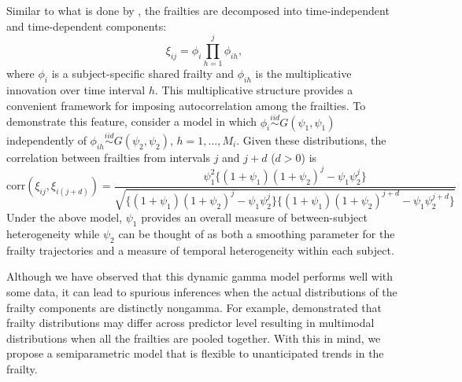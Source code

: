 \documentclass[10pt, letterpaper]{article}
\begin{document}
Similar to what is done by \citet{Paik1994}, the frailties are decomposed into time-independent and time-dependent components:
\begin{equation} \label{eq:2}
\xi_{ij} = \phi_i \prod_{h=1}^{j} \phi_{ih},
\end{equation}
where $\phi_i$ is a subject-specific shared frailty and $\phi_{ih}$ is the multiplicative innovation over time interval $h$. This multiplicative structure provides a convenient framework for imposing autocorrelation among the frailties. To demonstrate this feature, consider a model in which $\phi_i \stackrel{iid}{\sim} G(\psi_1, \psi_1)$ independently of $\phi_{ih} \stackrel{iid}{\sim} G(\psi_2, \psi_2)$, $h = 1, \dots, M_i$. Given these distributions, the correlation between frailties from intervals $j$ and $j + d$ ($d > 0$) is
\begin{equation} \label{eq:3}
\text{corr}(\xi_{ij}, \xi_{i(j+d)}) = \frac{\psi_1^2 \{ (1 + \psi_1)(1 + \psi_2)^j - \psi_1 \psi_2^j \}}{\sqrt{\{ (1 + \psi_1)(1 + \psi_2)^j - \psi_1 \psi_2^j \} \{ (1 + \psi_1)(1 + \psi_2)^{j+d} - \psi_1 \psi_2^{j+d} \}}}
\end{equation}
Under the above model, $\psi_1$ provides an overall measure of between-subject heterogeneity while $\psi_2$ can be thought of as both a smoothing parameter for the frailty trajectories and a measure of temporal heterogeneity within each subject.

Although we have observed that this dynamic gamma model performs well with some data, it can lead to spurious inferences when the actual distributions of the frailty components are distinctly nongamma. For example, \citet{Walker1997} demonstrated that frailty distributions may differ across predictor level resulting in multimodal distributions when all the frailties are pooled together. With this in mind, we propose a semiparametric model that is flexible to unanticipated trends in the frailty.
\end{document}
